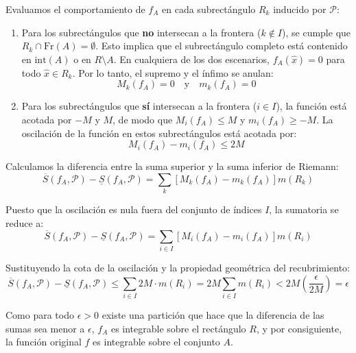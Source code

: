 \documentclass[11pt,letterpaper]{article}
\begin{document}
Evaluamos el comportamiento de $f_A$ en cada subrectángulo $R_k$ inducido por $\mathcal{P}$:
\begin{enumerate}
    \item Para los subrectángulos que \textbf{no} intersecan a la frontera ($k \notin I$), se cumple que $R_k \cap \text{Fr}(A) = \emptyset$. Esto implica que el subrectángulo completo está contenido en $\text{int}(A)$ o en $R \setminus A$. En cualquiera de los dos escenarios, $f_A(\hat{x}) = 0$ para todo $\hat{x} \in R_k$. Por lo tanto, el supremo y el ínfimo se anulan:
    \begin{equation*}
    M_k(f_A) = 0 \quad \text{y} \quad m_k(f_A) = 0
    \end{equation*}
    \item Para los subrectángulos que \textbf{sí} intersecan a la frontera ($i \in I$), la función está acotada por $-M$ y $M$, de modo que $M_i(f_A) \le M$ y $m_i(f_A) \ge -M$. La oscilación de la función en estos subrectángulos está acotada por:
    \begin{equation*}
    M_i(f_A) - m_i(f_A) \le 2M
    \end{equation*}
\end{enumerate}

Calculamos la diferencia entre la suma superior y la suma inferior de Riemann:
\begin{equation*}
\overline{S}(f_A, \mathcal{P}) - \underline{S}(f_A, \mathcal{P}) = \sum_{k} \left[ M_k(f_A) - m_k(f_A) \right] m(R_k)
\end{equation*}

Puesto que la oscilación es nula fuera del conjunto de índices $I$, la sumatoria se reduce a:
\begin{equation*}
\overline{S}(f_A, \mathcal{P}) - \underline{S}(f_A, \mathcal{P}) = \sum_{i \in I} \left[ M_i(f_A) - m_i(f_A) \right] m(R_i)
\end{equation*}

Sustituyendo la cota de la oscilación y la propiedad geométrica del recubrimiento:
\begin{equation*}
\overline{S}(f_A, \mathcal{P}) - \underline{S}(f_A, \mathcal{P}) \le \sum_{i \in I} 2M \cdot m(R_i) = 2M \sum_{i \in I} m(R_i) < 2M \left( \frac{\epsilon}{2M} \right) = \epsilon
\end{equation*}

Como para todo $\epsilon > 0$ existe una partición que hace que la diferencia de las sumas sea menor a $\epsilon$, $f_A$ es integrable sobre el rectángulo $R$, y por consiguiente, la función original $f$ es integrable sobre el conjunto $A$.
\end{document}
